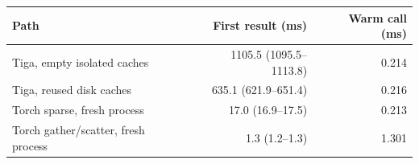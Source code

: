 \begin{tabular}{lrr}
\toprule
Path & First result (ms) & Warm call (ms) \\
\midrule
Tiga, empty isolated caches & 1105.5 (1095.5--1113.8) & 0.214 \\
Tiga, reused disk caches & 635.1 (621.9--651.4) & 0.216 \\
Torch sparse, fresh process & 17.0 (16.9--17.5) & 0.213 \\
Torch gather/scatter, fresh process & 1.3 (1.2--1.3) & 1.301 \\
\bottomrule
\end{tabular}
